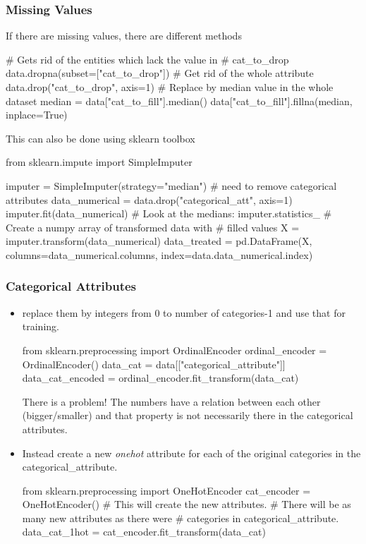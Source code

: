\documentclass{article}
\begin{document}
    \subsubsection*{Missing Values}
      If there are missing values, there are different methods
      \begin{python}
        # Gets rid of the entities which lack the value in
        # cat_to_drop
        data.dropna(subset=["cat_to_drop"])
        # Get rid of the whole attribute
        data.drop("cat_to_drop", axis=1)
        # Replace by median value in the whole dataset
        median = data["cat_to_fill"].median()
        data["cat_to_fill"].fillna(median, inplace=True)
      \end{python}
      This can also be done using sklearn toolbox
      \begin{python}
        from sklearn.impute import SimpleImputer

        imputer = SimpleImputer(strategy="median")
        # need to remove categorical attributes
        data_numerical = data.drop("categorical_att", axis=1)
        imputer.fit(data_numerical)
        # Look at the medians:
        imputer.statistics_
        # Create a numpy array of transformed data with
        # filled values
        X = imputer.transform(data_numerical)
        data_treated = pd.DataFrame(X,
                columns=data_numerical.columns,
                index=data.data_numerical.index)
      \end{python}


    \subsubsection*{Categorical Attributes}
      \begin{itemize}
        \item replace them by integers from 0 to number of categories-1 and use that for training.
          \begin{python}
            from sklearn.preprocessing import OrdinalEncoder
            ordinal_encoder = OrdinalEncoder()
            data_cat = data[["categorical_attribute"]]
            data_cat_encoded = ordinal_encoder.fit_transform(data_cat)
          \end{python}
          There is a problem! The numbers have a relation between each other (bigger/smaller) and that property is not necessarily there in the categorical attributes.
        \item Instead create a new \emph{onehot} attribute for each of the original categories in the categorical\_attribute.
          \begin{python}
            from sklearn.preprocessing import OneHotEncoder
            cat_encoder = OneHotEncoder()
            # This will create the new attributes.
            # There will be as many new attributes as there were
            # categories in categorical_attribute.
            data_cat_1hot = cat_encoder.fit_transform(data_cat)
          \end{python}
      \end{itemize}
\end{document}
